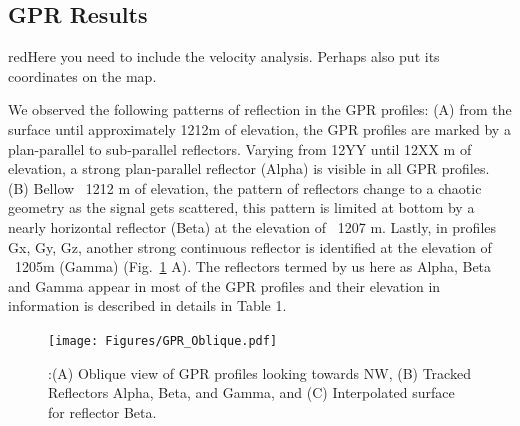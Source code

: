 \documentclass[5p]{elsarticle}
\newcommand{\alon}{\begin{color}{red}}
\newcommand{\aloff}{\end{color}}
\begin{document}
\subsection{GPR Results}

\alon Here you need to include the velocity analysis. Perhaps also put
its coordinates on the map.\aloff




We observed the following patterns of reflection in the GPR profiles: (A) from the surface until approximately 1212m of elevation, the GPR profiles are marked by a plan-parallel to sub-parallel reflectors. Varying from 12YY until 12XX m of elevation, a strong plan-parallel reflector (Alpha) is visible in all GPR profiles. (B) Bellow ~1212 m of elevation, the pattern of reflectors change to a chaotic geometry as the signal gets scattered, this pattern is limited at bottom  by a nearly horizontal reflector (Beta)  at the elevation of ~1207 m. Lastly, in profiles Gx,  Gy, Gz, another strong continuous reflector is identified at the elevation of ~1205m (Gamma) (Fig.~\ref{GPR_Oblique} A). 
The reflectors termed by us here as Alpha, Beta and Gamma appear in most of the GPR profiles and their elevation in information is described in details in Table 1. 



								 \begin{figure}[h]

	\texttt{[image: Figures/GPR\_Oblique.pdf]}
		\caption{:(A) Oblique view of GPR profiles looking towards NW, (B) Tracked Reflectors Alpha, Beta, and Gamma, and (C) Interpolated surface for reflector Beta. \label{GPR_Oblique}}

								   \end{figure}
								   
\end{document}
